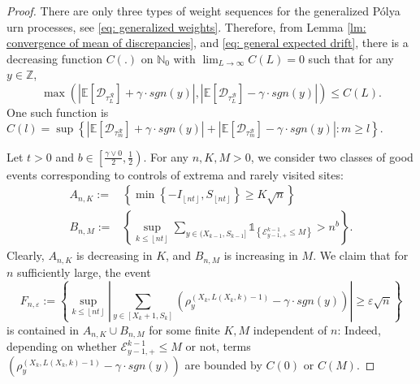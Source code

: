 \documentclass[EJP]{ejpecp} %
\newcommand{\abs}[1]{\left\vert #1 \right\vert}
\begin{document}
\begin{proof} There are only three types of weight sequences for the generalized P\'{o}lya urn processes, see \eqref{eq: generalized weights}. Therefore, from Lemma \ref{lm: convergence of mean of discrepancies}, and 
	\eqref{eq: general expected drift}, there is a decreasing function $C(.)$ on $\mathbb{N}_0$ with $\lim_{L\to \infty}C(L) =0$ such that for any $y \in \mathbb{Z}$,
	\begin{equation}\label{eq: uniform convergence}
		\max\left(\abs{\mathbb{E}\left[ \mathscr{D}_{\tau_L^{\mathscr{R}}} \right] + \gamma \cdot sgn(y)}, \abs{\mathbb{E}\left[ \mathscr{D}_{\tau_L^{\mathscr{B}}} \right] - \gamma \cdot sgn(y)} \right)\leq C(L).
	\end{equation} One such function is $C(l) = \sup \left\{  \abs{\mathbb{E}\left[ \mathscr{D}_{\tau_m^{\mathscr{R}}} \right] + \gamma \cdot sgn(y)} + \abs{\mathbb{E}\left[ \mathscr{D}_{\tau_m^{\mathscr{B}}} \right] - \gamma \cdot sgn(y)} : m\geq l \right\}.     $  
	
	
	Let $t>0$ and $b \in \left[\frac{\gamma \vee 0 }{2},\frac{1}{2}\right)$. For any $n,K,M>0$, we consider two classes of good events corresponding to controls of extrema and rarely visited sites:
	\begin{align*}
		A_{n,K}:=&\left\{ \min\left\{-I_{\left\lfloor n t\right\rfloor}, S_{\left\lfloor n t\right\rfloor}\right\} \geq K \sqrt{n}  \right\}
		\\
		B_{n,M}:=& \left\{  \sup_{k\leq \left\lfloor n t\right\rfloor} \sum_{ y\in (X_{k-1}, S_{k-1}]}  \mathbb{1}_{\left\{ \mathcal{E}^{k-1}_{y-1,+} \leq M  \right\}} >n^b  \right\}.
	\end{align*}
	Clearly, $A_{n,K}$ is decreasing in $K$, and $B_{n,M}$ is increasing in $M$. We claim that for $n$ sufficiently large, the event 
	\[
	F_{n,\varepsilon}:= \left\{ \sup_{k\leq \left\lfloor n t\right\rfloor}  \abs{  	\sum_{y\in [X_{k}+1 ,S_k]} \left( \rho^{(X_k,L(X_k,k)-1)}_y -  \gamma \cdot sgn(y) \right) } \geq  \varepsilon \sqrt{n}    \right\}
	\] 
	is contained in $A_{n,K} \cup B_{n,M} $ for some finite $K, M$ independent of $n$:   
	Indeed, depending on whether $\mathcal{E}^{k-1}_{y-1,+} \leq M$ or not, terms  $\left( \rho^{(X_k,L(X_k,k)-1)}_y -  \gamma \cdot sgn(y) \right)$ are bounded by $C(0)$ or $C(M)$. 
	

\end{proof}
\end{document}
